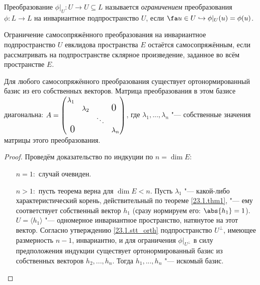   \begin{defn}
  Преобразование $\phi|_U:U\rightarrow U \subseteq L$ называется \textit{ограничением} преобразования $\phi:L\rightarrow L$ на инвариантное подпространство $U$, если $\fa u \in U \hookrightarrow \phi|_U(u)=\phi(u)$.
  \end{defn}  
  \begin{notion}
  Ограничение самосопряжённого преобразования на инвариантное подпространство $U$ евклидова пространства $E$ остаётся самосопряжённым, если рассматривать на подпространстве склярное произведение, заданное во всём пространстве $E$.
  \end{notion}  
  
  \begin{thm}
  Для любого самосопряжённого преобразования существует ортонормированный базис из его собственных векторов. Матрица преобразования в этом базисе диагональна: $A=
  \begin{pmatrix}
  \lambda_1 &           &        & \\
            & \lambda_2 &        & \fudge {0 }  \\
            &			& \ddots & \\
  \fudge{ 0}&			&		 & \lambda_n \\
  \end{pmatrix}$, где $\lambda_1,...,\lambda_n$ "--- собственные значения матрицы этого преобразования.
  \end{thm}
  \begin{proof} Проведём доказательство по индкуции по $n=\dim E$:
  \linebreak\vspace*{-\baselineskip}
  \begin{itemize}
  \item[\underline{$n=1:$}] случай очевиден.
  \item[\underline{$n>1:$}] пусть теорема верна для $\dim E<n$. Пусть $\lambda_1$ "--- какой-либо характеристический корень, действительный по теореме \ref{23.1.thm1}, "--- ему соответствует собственный вектор $h_1$ (сразу нормируем его: $\abs{h_1}=1$). $U=\langle h_1\rangle$ "--- одномерное инвариантное пространство, натянутое на этот вектор. Согласно утверждению \ref{23.1.stt_orth} подпространство $U^\perp$, имеющее размерность $n-1$, инвариантно, и для ограничения $\phi|_{U^\perp}$ в силу предположения индукции существует ортонормированный базис из собственных векторов $h_2,...,h_n$. Тогда $h_1,...,h_n$ "--- искомый базис.

  \end{itemize}
  \vspace{-1.65\baselineskip}  
  \end{proof}

